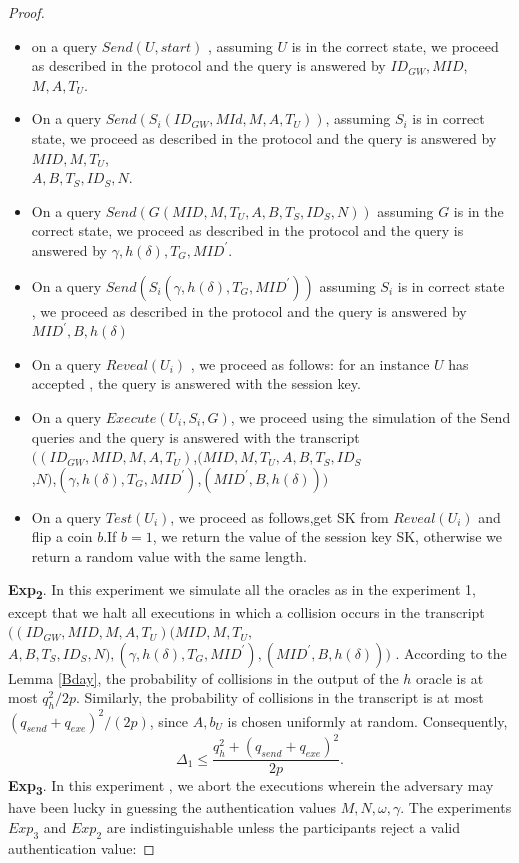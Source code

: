 \documentclass[a4paper,12pt]{report}
\begin{document}
\begin{proof}
\begin{itemize}
\item on a query $Send(U,start)$ , assuming $U$ is in the correct state, we proceed as described in the protocol and the query is answered by $ID_{GW},MID$, $M,A,T_U$.
\item On a query $Send(S_{i}(ID_{GW},MId,M,A,T_U))$, assuming $S_{i}$ is in correct state, we proceed as described in the protocol and the query is answered by  $MID,M, T_U $,\\ $A,B,T_S,ID_S,N$.
\item On a query $Send(G(MID,M,T_U, A,B,T_S,ID_S,N))$ assuming $G$ is in the correct state, we proceed as described in the protocol and the query is answered by $\gamma,h(\delta),T_G,MID^{\prime}$.
\item On a query $Send(S_{i}(\gamma,h(\delta),T_G,MID^{\prime}))$ assuming $S_{i}$ is in correct state , we proceed as described in the protocol and the query is answered by $MID^{\prime},B,h(\delta)$
\item On a query $Reveal(U_{i})$ , we proceed as follows: for an instance $U$ has accepted , the query is answered with the session key.
\item On a query $Execute(U_{i},S_{i},G)$, we proceed using the simulation of the Send queries and the query is answered with the transcript $((ID_{GW},MID,M,A,T_U)$,$(MID,M,T_U, A,B,T_S,ID_S$\\,$N)$,$(\gamma,h(\delta),T_G,MID^{\prime})$,$(MID^{\prime},B,h(\delta)))$
\item On a query $Test(U_{i})$, we proceed as follows,get SK from $Reveal(U_{i})$ and flip a coin $b$.If $b=1$, we return the value of the session key SK, otherwise we return a random value with the same length.
\end{itemize}
\textbf{Exp\textsubscript{2}}. In this experiment we simulate all
the oracles as in the experiment 1, except that we halt all
executions in which a collision occurs in the transcript
$((ID_{GW},MID,M,A,T_U)(MID,M,T_U,$\\$
A,B,T_S,ID_S,N),(\gamma,h(\delta),T_G,MID^{\prime}),(MID^{\prime},B,h(\delta)))$
. According to the Lemma \ref{Bday}, the probability of collisions
in the output of the $h$ oracle is at most $q^2_{h}/2p$. Similarly,
the probability of collisions in the transcript is at most
$(q_{send}+q_{exe})^2/(2p)$, since $A, b_U$ is chosen uniformly at
random. Consequently,
\begin{equation}
\Delta_1 \leq \frac{q_{h}^2+(q_{send}+q_{exe})^2}{2p}.
\end{equation}
\textbf{Exp\textsubscript{3}}. In this experiment , we abort the executions wherein the adversary may have been lucky in guessing the authentication values $M,N, \omega,\gamma$. The experiments $Exp_3$ and $Exp_2$ are indistinguishable unless the participants reject a valid authentication value:

\end{proof}
\end{document}
